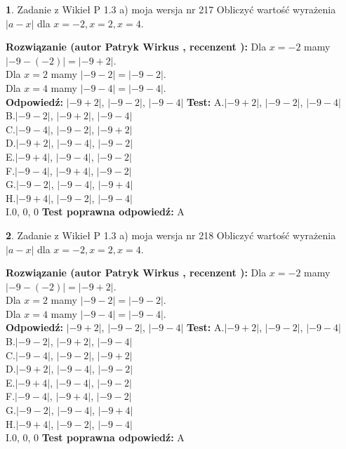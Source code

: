 \documentclass[12pt, a4paper]{article}
\theoremstyle{definition} %
\newtheorem{zad}{}
\newcommand{\zadStart}[1]{\begin{zad}#1\newline}
\newcommand{\zadStop}{\end{zad}}
\newcommand{\rozwStart}[2]{\noindent \textbf{Rozwiązanie (autor #1 , recenzent #2): }\newline}
\newcommand{\rozwStop}{\newline}
\newcommand{\odpStart}{\noindent \textbf{Odpowiedź:}\newline}
\newcommand{\odpStop}{\newline}
\newcommand{\testStart}{\noindent \textbf{Test:}\newline}
\newcommand{\testStop}{\newline}
\newcommand{\kluczStart}{\noindent \textbf{Test poprawna odpowiedź:}\newline}
\newcommand{\kluczStop}{\newline}
\begin{document}
\zadStart{Zadanie z Wikieł P 1.3 a) moja wersja nr 217}
Obliczyć wartość wyrażenia $|a - x|$ dla $x=-2,x=2,x=4$.
\zadStop
\rozwStart{Patryk Wirkus}{}
Dla $x = -2$ mamy $|-9 - (-2)| = |-9 + 2|$.\\
Dla $x = 2$ mamy $|-9 - 2| = |-9 - 2|$.\\
Dla $x = 4$ mamy $|-9 - 4| = |-9 - 4|$.\\
\rozwStop
\odpStart
$|-9 + 2|$, $|-9 - 2|$, $|-9 - 4|$
\odpStop
\testStart
A.$|-9 + 2|$, $|-9 - 2|$, $|-9 - 4|$\\
B.$|-9 - 2|$, $|-9 + 2|$, $|-9 - 4|$\\
C.$|-9 - 4|$, $|-9 - 2|$, $|-9 + 2|$\\
D.$|-9 + 2|$, $|-9 - 4|$, $|-9 - 2|$\\
E.$|-9 + 4|$, $|-9 - 4|$, $|-9 - 2|$\\
F.$|-9 - 4|$, $|-9 + 4|$, $|-9 - 2|$\\
G.$|-9 - 2|$, $|-9 - 4|$, $|-9 + 4|$\\
H.$|-9 + 4|$, $|-9 - 2|$, $|-9 - 4|$\\
I.$0$, $0$, $0$
\testStop
\kluczStart
A
\kluczStop



\zadStart{Zadanie z Wikieł P 1.3 a) moja wersja nr 218}
Obliczyć wartość wyrażenia $|a - x|$ dla $x=-2,x=2,x=4$.
\zadStop
\rozwStart{Patryk Wirkus}{}
Dla $x = -2$ mamy $|-9 - (-2)| = |-9 + 2|$.\\
Dla $x = 2$ mamy $|-9 - 2| = |-9 - 2|$.\\
Dla $x = 4$ mamy $|-9 - 4| = |-9 - 4|$.\\
\rozwStop
\odpStart
$|-9 + 2|$, $|-9 - 2|$, $|-9 - 4|$
\odpStop
\testStart
A.$|-9 + 2|$, $|-9 - 2|$, $|-9 - 4|$\\
B.$|-9 - 2|$, $|-9 + 2|$, $|-9 - 4|$\\
C.$|-9 - 4|$, $|-9 - 2|$, $|-9 + 2|$\\
D.$|-9 + 2|$, $|-9 - 4|$, $|-9 - 2|$\\
E.$|-9 + 4|$, $|-9 - 4|$, $|-9 - 2|$\\
F.$|-9 - 4|$, $|-9 + 4|$, $|-9 - 2|$\\
G.$|-9 - 2|$, $|-9 - 4|$, $|-9 + 4|$\\
H.$|-9 + 4|$, $|-9 - 2|$, $|-9 - 4|$\\
I.$0$, $0$, $0$
\testStop
\kluczStart
A
\kluczStop
\end{document}
